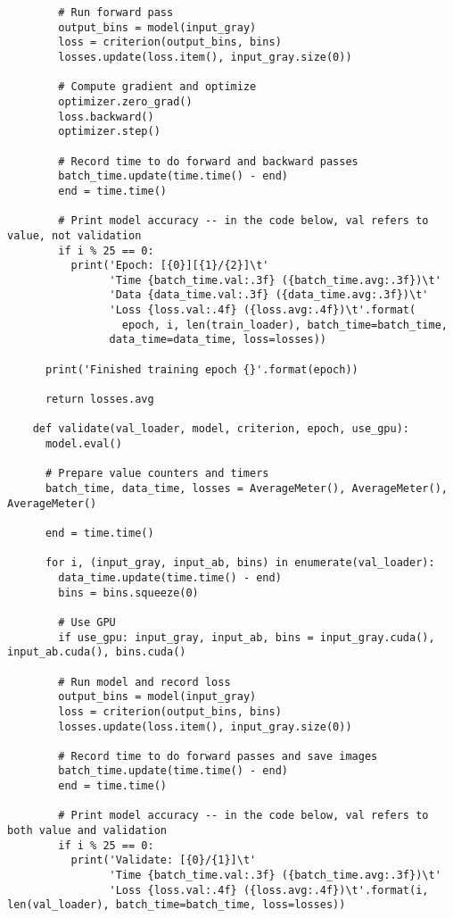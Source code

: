 \begin{longlisting}
\begin{verbatim}
        # Run forward pass
        output_bins = model(input_gray)
        loss = criterion(output_bins, bins)
        losses.update(loss.item(), input_gray.size(0))

        # Compute gradient and optimize
        optimizer.zero_grad()
        loss.backward()
        optimizer.step()

        # Record time to do forward and backward passes
        batch_time.update(time.time() - end)
        end = time.time()

        # Print model accuracy -- in the code below, val refers to value, not validation
        if i % 25 == 0:
          print('Epoch: [{0}][{1}/{2}]\t'
                'Time {batch_time.val:.3f} ({batch_time.avg:.3f})\t'
                'Data {data_time.val:.3f} ({data_time.avg:.3f})\t'
                'Loss {loss.val:.4f} ({loss.avg:.4f})\t'.format(
                  epoch, i, len(train_loader), batch_time=batch_time,
                data_time=data_time, loss=losses))

      print('Finished training epoch {}'.format(epoch))

      return losses.avg

    def validate(val_loader, model, criterion, epoch, use_gpu):
      model.eval()

      # Prepare value counters and timers
      batch_time, data_time, losses = AverageMeter(), AverageMeter(), AverageMeter()

      end = time.time()

      for i, (input_gray, input_ab, bins) in enumerate(val_loader):
        data_time.update(time.time() - end)
        bins = bins.squeeze(0)

        # Use GPU
        if use_gpu: input_gray, input_ab, bins = input_gray.cuda(), input_ab.cuda(), bins.cuda()

        # Run model and record loss
        output_bins = model(input_gray)
        loss = criterion(output_bins, bins)
        losses.update(loss.item(), input_gray.size(0))

        # Record time to do forward passes and save images
        batch_time.update(time.time() - end)
        end = time.time()

        # Print model accuracy -- in the code below, val refers to both value and validation
        if i % 25 == 0:
          print('Validate: [{0}/{1}]\t'
                'Time {batch_time.val:.3f} ({batch_time.avg:.3f})\t'
                'Loss {loss.val:.4f} ({loss.avg:.4f})\t'.format(i, len(val_loader), batch_time=batch_time, loss=losses))


\end{verbatim}
\end{longlisting}
